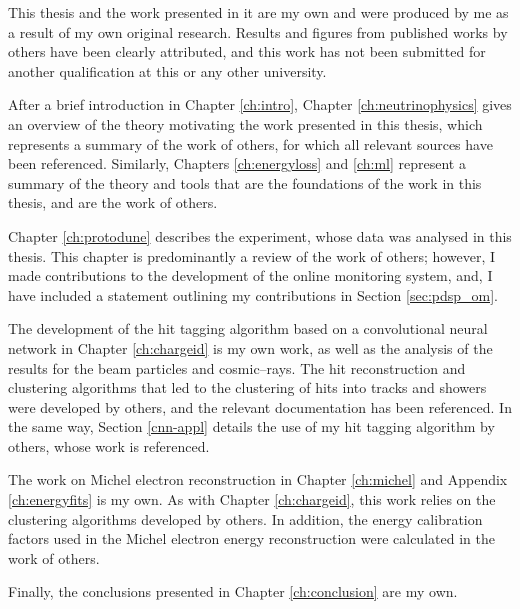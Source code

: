 This thesis and the work presented in it are my own and were produced by me as a
result of my own original research. Results and figures from published works by
others have been clearly attributed, and this work has not been submitted for
another qualification at this or any other university.

\medskip\noindent
After a brief introduction in Chapter \ref{ch:intro}, Chapter 
\ref{ch:neutrinophysics} gives an overview of the theory motivating the work 
presented in this thesis, which represents a summary of the work of others, for
which all relevant sources have been referenced. Similarly, Chapters
\ref{ch:energyloss} and \ref{ch:ml} represent a summary of the theory and tools
that are the foundations of the work in this thesis, and are the work of others.

\medskip\noindent
Chapter \ref{ch:protodune} describes the \protodune{} experiment, whose data was
analysed in this thesis. This chapter is predominantly a review of the work of
others; however, I made contributions to the development of the online 
monitoring system, and, I have included a statement outlining my contributions 
in Section \ref{sec:pdsp_om}.

\medskip\noindent
The development of the hit tagging algorithm based on a convolutional neural 
network in Chapter \ref{ch:chargeid} is my own work, as well as the analysis 
of the results for the \protodune{} beam particles and cosmic--rays. The hit 
reconstruction and clustering algorithms that led to the clustering of hits into
tracks and showers were developed by others, and the relevant documentation has 
been referenced. In the same way, Section \ref{cnn-appl} details the use of my 
hit tagging algorithm by others, whose work is referenced.

\medskip\noindent
The work on Michel electron reconstruction in Chapter \ref{ch:michel} and 
Appendix \ref{ch:energyfits} is my own. As with Chapter \ref{ch:chargeid}, this
work relies on the clustering algorithms developed by others. In addition, the 
energy calibration factors used in the Michel electron energy reconstruction
were calculated in the work of others.

\medskip\noindent
Finally, the conclusions presented in Chapter \ref{ch:conclusion} are my own.
